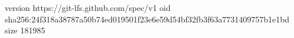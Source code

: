 version https://git-lfs.github.com/spec/v1
oid sha256:24f318a38787a50b74ed019501f23e6e59d54bf32fb3f63a7731409757b1e1bd
size 181985
